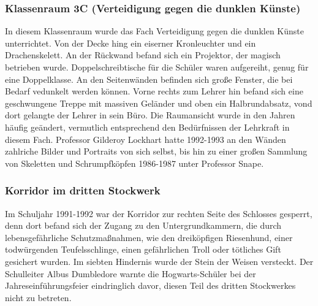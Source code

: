 \documentclass[a4paper, 10pt]{article}
\begin{document}
\subsubsection*{\large Klassenraum 3C (Verteidigung gegen die dunklen Künste)}
In diesem Klassenraum wurde das Fach Verteidigung gegen die dunklen Künste unterrichtet. Von der Decke hing ein eiserner Kronleuchter und ein Drachenskelett. An der Rückwand befand sich ein Projektor, der magisch betrieben wurde. Doppelschreibtische für die Schüler waren aufgereiht, genug für eine Doppelklasse. An den Seitenwänden befinden sich große Fenster, die bei Bedarf vedunkelt werden können. Vorne rechts zum Lehrer hin befand sich eine geschwungene Treppe mit massiven Geländer und oben ein Halbrundabsatz, vond dort gelangte der Lehrer in sein Büro.
\vspace{10pt}
\newline
Die Raumansicht wurde in den Jahren häufig geändert, vermutlich entsprechend den Bedürfnissen der Lehrkraft in diesem Fach. Professor Gilderoy Lockhart hatte 1992-1993 an den Wänden zahlriche Bilder und Portraits von sich selbst, bis hin zu einer großen Sammlung von Skeletten und Schrumpfköpfen 1986-1987 unter Professor Snape.
\subsubsection*{\large Korridor im dritten Stockwerk}
Im Schuljahr 1991-1992 war der Korridor zur rechten Seite des Schlosses gesperrt, denn dort befand sich der Zugang zu den Untergrundkammern, die durch lebensgefährliche Schutzmaßnahmen, wie den dreiköpfigen Riesenhund, einer todwürgenden Teufelsschlinge, einen gefährlichen Troll oder tötliches Gift gesichert wurden. Im siebten Hindernis wurde der Stein der Weisen versteckt. Der Schulleiter Albus Dumbledore warnte die Hogwarts-Schüler bei der Jahreseinführungsfeier eindringlich davor, diesen Teil des dritten Stockwerkes nicht zu betreten.
\end{document}
